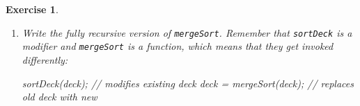 \documentclass[12pt]{book}
\theoremstyle{exercise}
\newtheorem{exercise}{Exercise}[chapter]
\newcommand{\java}[1]{\verb"#1"}
\newcommand{\java}[1]{\lstinline{#1}} %
\begin{document}
\begin{exercise}
\begin{enumerate}
\item Write the fully recursive version of \java{mergeSort}.
Remember that \java{sortDeck} is a modifier and \java{mergeSort} is a function, which means that they get invoked differently:

\begin{code}
sortDeck(deck);              // modifies existing deck
deck = mergeSort(deck);      // replaces old deck with new
\end{code}

\end{enumerate}
\end{exercise}


\backmatter
\appendix

%
%
%
%

\printindex
\cleardoublepage
\end{document}
